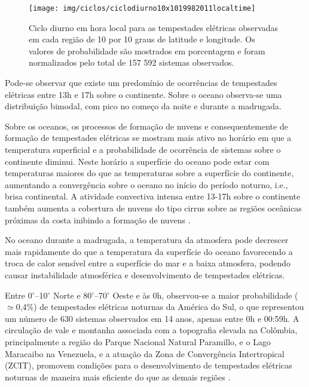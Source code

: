 \begin{figure}[!hb]
\centering
{\texttt{[image: img/ciclos/ciclodiurno10x1019982011localtime]}}  
\caption{Ciclo diurno em hora local para as tempestades elétricas observadas em cada região de 10 por 10 graus de latitude e longitude. Os valores de probabilidade são mostrados em porcentagem e foram normalizados pelo total de {157 592} sistemas observados.}
\label{diurno}
\end{figure}

Pode-se observar que existe um predomínio de ocorrências de tempestades elétricas entre 13h e 17h sobre o continente. Sobre o oceano observa-se  uma distribuição bimodal, com pico no começo da noite e durante a madrugada.


Sobre os oceanos, os processos de formação de nuvens e consequentemente de formação de tempestades elétricas se mostram mais ativo no horário em que a temperatura superficial e a probabilidade de ocorrência de sistemas sobre o continente  diminui. Neste horário a superfície do oceano pode estar com temperaturas maiores do que as temperaturas sobre a superfície do continente, aumentando a convergência sobre o oceano no início do período noturno, i.e., brisa continental. A atividade convectiva intensa entre 13-17h sobre o continente também aumenta a cobertura de nuvens do tipo cirrus sobre as regiões oceânicas próximas da costa inibindo a formação de nuvens \cite{nesbitt2003diurnal}.

No oceano durante a madrugada, a temperatura da atmosfera pode decrescer mais rapidamente do que a temperatura da superfície do oceano favorecendo a troca de calor sensível entre a superfície do mar e a baixa atmosfera, podendo causar instabilidade atmosférica e desenvolvimento de tempestades elétricas.


Entre 0$^{\circ}$--10$^{\circ}$ Norte e 80$^{\circ}$--70$^{\circ}$ Oeste e às 0h, observou-se a maior probabilidade ($\simeq$0,4\%) de tempestades elétricas noturnas da América do Sul, o que representou um número de 630 sistemas observados em 14 anos, apenas entre 0h e 00:59h. A circulação de vale e montanha associada com a topografia elevada na Colômbia, principalmente a região do Parque Nacional Natural Paramillo, e o Lago Maracaibo na Venezuela, e a atuação da Zona de Convergência Intertropical (ZCIT), promovem condições para o desenvolvimento de tempestades elétricas noturnas de maneira mais eficiente do que as demais regiões \cite{burgesser2012, albrecht2011b}.

